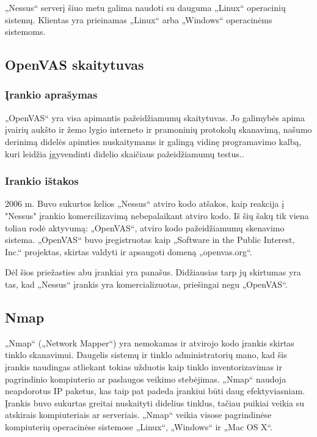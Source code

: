 \documentclass[a4paper,12pt,fleqn]{article}
\begin{document}
„Nessus“ serverį šiuo metu galima naudoti su dauguma „Linux“ operacinių sistemų. Klientas yra prieinamas „Linux“ arba „Windows“ operacinėms sistemoms. 



\subsection{OpenVAS skaitytuvas}
\label{sec:example}

\subsubsection{Įrankio aprašymas}

„OpenVAS“ yra visa apimantis pažeidžiamumų skaitytuvas. Jo galimybės apima įvairių aukšto ir žemo lygio interneto ir pramoninių protokolų skanavimą, našumo derinimą didelės apimties nuskaitymams ir galingą vidinę programavimo kalbą, kuri leidžia įgyvendinti didelio skaičiaus pažeidžiamumų testus.\cite{inproceedings}.

\subsubsection{Irankio ištakos}


2006 m. Buvo sukurtos kelios „Nessus“ atviro kodo atšakos, kaip reakcija į "Nessus" įrankio komercilizavimą nebepalaikant atviro kodo. Iš šių šakų tik viena toliau rodė aktyvumą: „OpenVAS“, atviro kodo pažeidžiamumų skenavimo sistema. „OpenVAS“ buvo įregistruotas kaip „Software in the Public Interest, Inc.“ projektas, skirtas valdyti ir apsaugoti domeną „openvas.org“.

Dėl šios priežasties abu įrankiai yra panašus. Didžiausias tarp jų skirtumas yra tas, kad „Nessus“ įrankis yra komercializuotas, priešingai negu „OpenVAS“.


\subsection{Nmap}
\label{sec:nmap}

„Nmap“ („Network Mapper“) yra nemokamas ir atvirojo kodo įrankis skirtas tinklo skanavimui. Daugelis sistemų ir tinklo administratorių mano, kad šis įrankis naudingas atliekant tokias užduotis kaip tinklo inventorizavimas ir  pagrindinio kompiuterio ar paslaugos veikimo stebėjimas. „Nmap“ naudoja neapdorotus IP paketus, kas taip pat padeda įrankiui būti daug efektyviasniam. Įrankis buvo sukurtas greitai nuskaityti didelius tinklus, tačiau puikiai veikia su atskirais kompiuteriais ar serveriais. „Nmap“ veikia visose pagrindinėse kompiuterių operacinėse sistemose  „Linux“, „Windows“ ir „Mac OS X“\cite{Orebaugh:2008:NEY:1571843}. 
\end{document}
